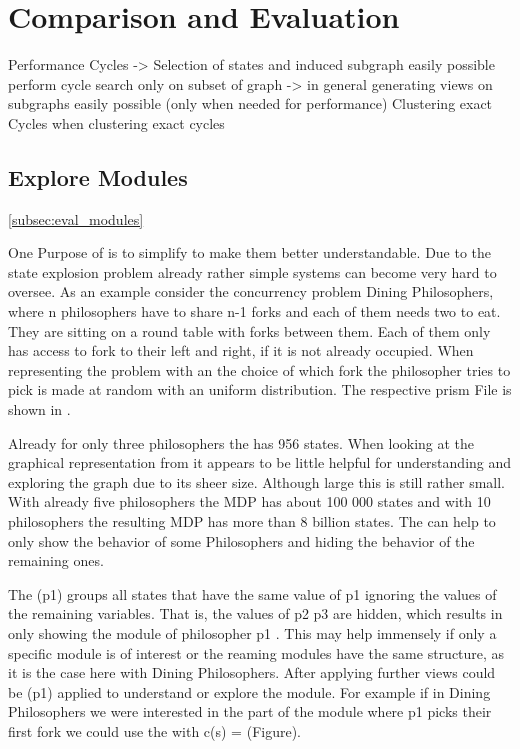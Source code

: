 \documentclass[preview]{standalone}
\begin{document}
\section{Comparison and Evaluation}
Performance Cycles -> Selection of states and induced subgraph easily possible perform cycle search only on subset of graph 
-> in general generating views on subgraphs easily possible (only when needed for performance)
Clustering exact Cycles when clustering exact cycles


\subsection{Explore Modules}\ref{subsec:eval_modules}

One Purpose of \viewsN is to simplify \mdpsN to make them better understandable. Due to the state explosion problem already rather simple systems can become very hard to oversee. As an example consider the concurrency problem Dining Philosophers, where n philosophers have to share n-1 forks and each of them needs two to eat. They are sitting on a round table with forks between them. Each of them only has access to fork to their left and right, if it is not already occupied. When representing the problem with an \mdpN the choice of which fork the philosopher tries to pick is made at random with an uniform distribution. The respective prism File is shown in .

Already for only three philosophers the \mdpN has 956 states. When looking at the graphical representation from \pmcvis {} it appears to be little helpful for understanding and exploring the graph due to its sheer size. Although large this \mdp is still rather small. With already five philosophers the MDP has about 100 000 states and with 10 philosophers the resulting MDP has more than 8 billion states. The \viewN \viewparamvalident can help to only show the behavior of some Philosophers and hiding the behavior of the remaining ones. 

The \viewN \viewparamvalident(p1) groups all states that have the same value of p1 ignoring the values of the remaining variables. That is, the values of p2 p3 are hidden, which results in only showing the module of philosopher p1 . This may help immensely if only a specific module is of interest or the reaming modules have the same structure, as it is the case here with Dining Philosophers. After applying further views could be \viewparamvalident(p1) applied to understand or explore the module. For example if in Dining Philosophers we were interested in the part of the module where p1 picks their first fork we could use the \viewN \viewparamdnf with c(s) = ({Figure}).
\end{document}
